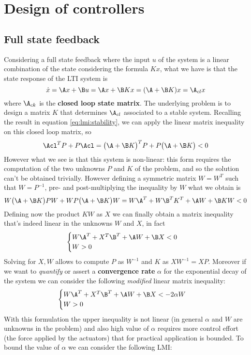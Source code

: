 \section{Design of controllers}
\subsection{Full state feedback}
	Considering a full state feedback where the input $u$ of the system is a linear combination of the state considering the formula $Kx$, what we have is that the state response of the LTI system is
	\[ \dot x = \A x + \B u = \A x + \B K x = (\A + \B K) x = \A_{cl} x  \]
	where $\A_{ck}$ is the \textbf{closed loop state matrix}. The underlying problem is to design a matrix $K$ that determines $\A_{cl}$ associated to a stable system. Recalling the result in equation \ref{eq:lmi:stability}, we can apply the linear matrix inequality on this closed loop matrix, so
	\[ \Acl^T P + P \Acl = \big(\A + \B K\big) ^T P + P \big(\A + \B K\big) < 0\] 
	However what we see is that this system is non-linear: this form requires the computation of the two unknowns $P$ and $K$ of the problem, and so the solution can't be obtained trivially. However defining a symmetric matrix $W=W^T$ such that $W = P^{-1}$, pre- and post-multiplying the inequality by $W$ what we obtain is
	\[ W\big( \A + \B K \big) PW + WP\big(\A + \B K\big) W = W \A^T + W \B^T K^T + \A W + \B KW < 0 \]
	Defining now the product $KW$ as $X$ we can finally obtain a matrix inequality that's indeed linear in the unknowns $W$ and $X$, in fact
	\begin{equation}
	\begin{cases}
		W\A^T + X^T\B ^T + \A W + \B X < 0 \\ W > 0
	\end{cases}
	\end{equation}
	Solving for $X,W$ allows to compute $P$ as $W^{-1}$ and $K$ as $XW^{-1} = XP$. Moreover if we want to \textit{quantify} or assert a \textbf{convergence rate} $\alpha$ for the exponential decay of the system we can consider the following \textit{modified} linear matrix inequality:
	\begin{equation}
		\begin{cases}
			W\A^T + X^T\B ^T + \A W + \B X < -2\alpha W \\ W > 0
		\end{cases}
	\end{equation}
	With this formulation the upper inequality is not linear (in general $\alpha$ and $W$ are unknowns in the problem) and also high value of $\alpha$ requires more control effort (the force applied by the actuators) that for practical application is bounded. To bound the value of $\alpha$ we can consider the following LMI:
